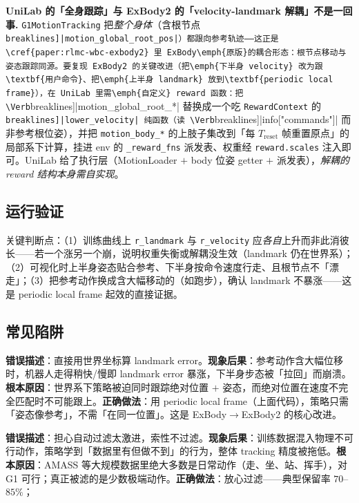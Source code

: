 \begin{note}
\textbf{UniLab 的「全身跟踪」与 ExBody2 的「velocity-landmark 解耦」不是一回事.}\;
\texttt{G1MotionTracking} 把\emph{整个身体}（含根节点 \Verb[breaklines]|motion_global_root_pos|）都跟向参考轨迹——这正是 \cref{paper:rlmc-wbc-exbody2} 里 ExBody\emph{原版}的耦合形态：根节点移动与姿态跟踪同源。要复现 ExBody2 的关键改进（把\emph{下半身 velocity} 改为跟\textbf{用户命令}、把\emph{上半身 landmark} 放到\textbf{periodic local frame}），在 UniLab 里需\emph{自定义} reward 函数：把 \Verb[breaklines]|motion_global_root_*| 替换成一个吃 \verb|RewardContext| 的 \Verb[breaklines]|lower_velocity| 纯函数（读 \Verb[breaklines]|info["commands"]| 而非参考根位姿），并把 \verb|motion_body_*| 的上肢子集改到「每 $T_{\mathrm{reset}}$ 帧重置原点」的局部系下计算，挂进 env 的 \verb|_reward_fns| 派发表、权重经 \verb|reward.scales| 注入即可。UniLab 给了执行层（MotionLoader $+$ body 位姿 getter $+$ 派发表），\emph{解耦的 reward 结构本身需自实现}\cite{unilab2026}。
\end{note}

\subsection{运行验证}
关键判断点：（1）训练曲线上 \verb|r_landmark| 与 \verb|r_velocity| 应\emph{各自}上升而非此消彼长——若一个涨另一个崩，说明权重失衡或解耦没生效（landmark 仍在世界系）；（2）可视化时上半身姿态贴合参考、下半身按命令速度行走、且根节点不「漂走」；（3）把参考动作换成含大幅移动的（如跑步），确认 landmark 不暴涨——这是 periodic local frame 起效的直接证据。

\subsection{常见陷阱}
\begin{pitfall}
\textbf{错误描述}：直接用世界坐标算 landmark error。\textbf{现象后果}：参考动作含大幅位移时，机器人走得稍快/慢即 landmark error 暴涨，下半身步态被「拉回」而崩溃。\textbf{根本原因}：世界系下策略被迫同时跟踪绝对位置 $+$ 姿态，而绝对位置在速度不完全匹配时不可能跟上。\textbf{正确做法}：用 periodic local frame（上面代码），策略只需「姿态像参考」，不需「在同一位置」。这是 ExBody$\to$ExBody2 的核心改进。
\end{pitfall}
\begin{pitfall}
\textbf{错误描述}：担心自动过滤太激进，索性不过滤。\textbf{现象后果}：训练数据混入物理不可行动作，策略学到「数据里有但做不到」的行为，整体 tracking 精度被拖低。\textbf{根本原因}：AMASS 等大规模数据里绝大多数是日常动作（走、坐、站、挥手），对 G1 可行；真正被滤的是少数极端动作。\textbf{正确做法}：放心过滤——典型保留率 $70$--$85\%$；
\end{pitfall}

